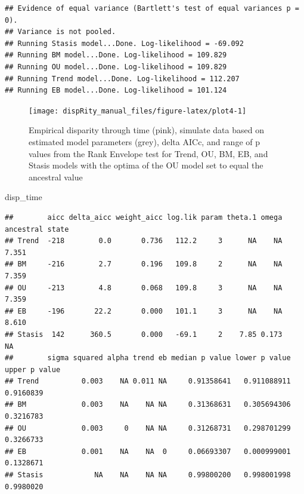 \documentclass[]{book}
\newenvironment{Shaded}{\begin{snugshade}}{\end{snugshade}}
\newcommand{\NormalTok}[1]{#1}
\begin{document}
\begin{verbatim}
## Evidence of equal variance (Bartlett's test of equal variances p = 0).
## Variance is not pooled.
## Running Stasis model...Done. Log-likelihood = -69.092
## Running BM model...Done. Log-likelihood = 109.829
## Running OU model...Done. Log-likelihood = 109.829
## Running Trend model...Done. Log-likelihood = 112.207
## Running EB model...Done. Log-likelihood = 101.124
\end{verbatim}

\begin{figure}

{\centering \texttt{[image: dispRity\_manual\_files/figure-latex/plot4-1]} 

}

\caption{Empirical disparity through time (pink), simulate data based on estimated model parameters (grey), delta AICc, and range of p values from the Rank Envelope test for Trend, OU, BM, EB, and Stasis models with the optima of the OU model set to equal the ancestral value}\label{fig:plot4}
\end{figure}

\begin{Shaded}
\begin{Highlighting}[]
\NormalTok{disp_time}
\end{Highlighting}
\end{Shaded}

\begin{verbatim}
##        aicc delta_aicc weight_aicc log.lik param theta.1 omega ancestral state
## Trend  -218        0.0       0.736   112.2     3      NA    NA           7.351
## BM     -216        2.7       0.196   109.8     2      NA    NA           7.359
## OU     -213        4.8       0.068   109.8     3      NA    NA           7.359
## EB     -196       22.2       0.000   101.1     3      NA    NA           8.610
## Stasis  142      360.5       0.000   -69.1     2    7.85 0.173              NA
##        sigma squared alpha trend eb median p value lower p value upper p value
## Trend          0.003    NA 0.011 NA     0.91358641   0.911088911     0.9160839
## BM             0.003    NA    NA NA     0.31368631   0.305694306     0.3216783
## OU             0.003     0    NA NA     0.31268731   0.298701299     0.3266733
## EB             0.001    NA    NA  0     0.06693307   0.000999001     0.1328671
## Stasis            NA    NA    NA NA     0.99800200   0.998001998     0.9980020
\end{verbatim}
\end{document}
